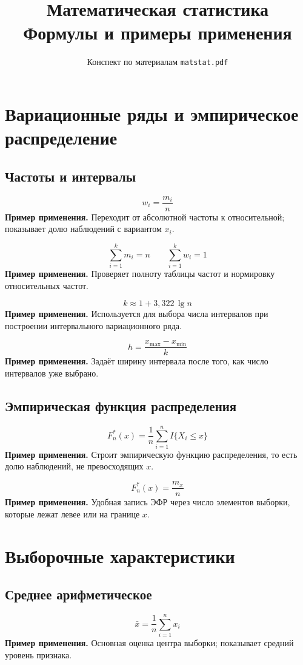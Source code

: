 \documentclass[a4paper,14pt]{extarticle}
\title{Математическая статистика\\Формулы и примеры применения}
\author{Конспект по материалам \texttt{matstat.pdf}}
\date{}
\newcommand{\FormulaNote}[2]{%
  \begin{equation*}
  #1
  \end{equation*}
  \noindent\textbf{Пример применения.} #2\par\medskip
}
\begin{document}
\maketitle
\tableofcontents
\newpage

\section{Вариационные ряды и эмпирическое распределение}

\subsection{Частоты и интервалы}

\FormulaNote{w_i=\frac{m_i}{n}}{Переходит от абсолютной частоты к относительной; показывает долю наблюдений с вариантом $x_i$.}

\FormulaNote{\sum_{i=1}^k m_i=n \qquad \sum_{i=1}^k w_i=1}{Проверяет полноту таблицы частот и нормировку относительных частот.}

\FormulaNote{k\approx 1+3{,}322\,\lg n}{Используется для выбора числа интервалов при построении интервального вариационного ряда.}

\FormulaNote{h=\frac{x_{\max}-x_{\min}}{k}}{Задаёт ширину интервала после того, как число интервалов уже выбрано.}

\subsection{Эмпирическая функция распределения}

\FormulaNote{F_n^*(x)=\frac{1}{n}\sum_{i=1}^{n} I\{X_i\le x\}}{Строит эмпирическую функцию распределения, то есть долю наблюдений, не превосходящих $x$.}

\FormulaNote{F_n^*(x)=\frac{m_x}{n}}{Удобная запись ЭФР через число элементов выборки, которые лежат левее или на границе $x$.}

\section{Выборочные характеристики}

\subsection{Среднее арифметическое}

\FormulaNote{\bar{x}=\frac{1}{n}\sum_{i=1}^{n}x_i}{Основная оценка центра выборки; показывает средний уровень признака.}
\end{document}
